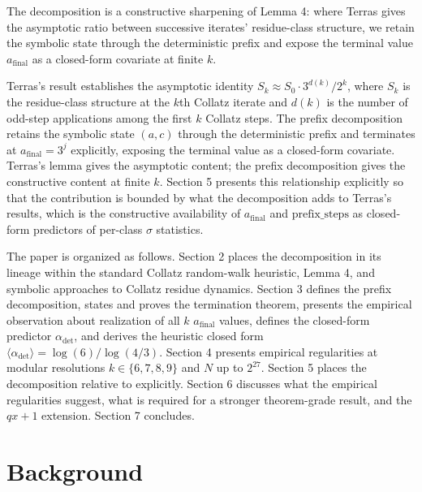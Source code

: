 \documentclass{article}
\theoremstyle{plain}
\begin{document}
The decomposition is a constructive sharpening of \citet{terras1976} Lemma 4: where Terras gives the asymptotic ratio between successive iterates' residue-class structure, we retain the symbolic state through the deterministic prefix and expose the terminal value $a_{\text{final}}$ as a closed-form covariate at finite $k$.

Terras's result establishes the asymptotic identity $S_k \approx S_0 \cdot 3^{d(k)}/ 2^k$, where $S_k$ is the residue-class structure at the $k$th Collatz iterate and $d(k)$ is the number of odd-step applications among the first $k$ Collatz steps. The prefix decomposition retains the symbolic state $(a, c)$ through the deterministic prefix and terminates at $a_{\text{final}} = 3^j$ explicitly, exposing the terminal value as a closed-form covariate. Terras's lemma gives the asymptotic content; the prefix decomposition gives the constructive content at finite $k$. Section 5 presents this relationship explicitly so that the contribution is bounded by what the decomposition adds to Terras's results, which is the constructive availability of $a_{\text{final}}$ and $\text{prefix\_steps}$ as closed-form predictors of per-class $\sigma$ statistics.

The paper is organized as follows. Section 2 places the decomposition in its lineage within the standard Collatz random-walk heuristic, \citet{terras1976} Lemma 4, and symbolic approaches to Collatz residue dynamics. Section 3 defines the prefix decomposition, states and proves the termination theorem, presents the empirical observation about realization of all $k$ $a_{\text{final}}$ values, defines the closed-form predictor $\alpha_{\text{det}}$, and derives the heuristic closed form $\langle \alpha_{\text{det}} \rangle = \log(6) / \log(4/3)$. Section 4 presents empirical regularities at modular resolutions $k \in \{6, 7, 8, 9\}$ and $N$ up to $2^{27}$. Section 5 places the decomposition relative to \citet{terras1976} explicitly. Section 6 discusses what the empirical regularities suggest, what is required for a stronger theorem-grade result, and the $qx+1$ extension. Section 7 concludes.

\section{Background}
\end{document}
